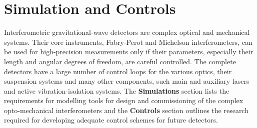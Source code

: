 \chapter{Simulation and Controls}
\label{sec:Sim_Controls}

\vspace{-1cm}

Interferometric gravitational-wave detectors are complex optical and mechanical systems. Their core instruments, Fabry-Perot and Michelson interferometers, can be used for high-precision measurements only if their parameters, especially their length and angular degrees of freedom, are careful controlled. 
The complete detectors have a large number of control loops for the various optics, their suspension systems and many other components, such main and auxiliary lasers and active vibration-isolation systems. The \textbf{Simulations} section lists the requirements for modelling tools for design and commissioning of the complex opto-mechanical interferometers and the \textbf{Controls} section outlines the research required for developing adequate control schemes for future detectors.

